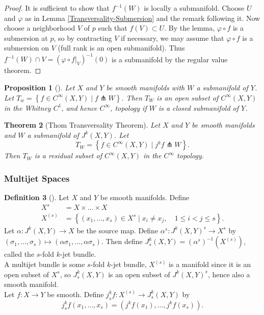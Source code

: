 \documentclass[reqno]{amsart}
\newtheorem{theorem}{Theorem}[section]
\newtheorem{proposition}[theorem]{Proposition}
\theoremstyle{definition}
\newtheorem{definition}[theorem]{Definition}
\theoremstyle{remark}
\begin{document}
\begin{proof}
    It is sufficient to show that
    $f^{-1}(W)$ is locally a submanifold. Choose
    $U$ and $\varphi $ as in Lemma \ref{Transversality-Submersion}
    and the remark following it. Now
    choose a neighborhood $V$ of $p$ such that
    $f(V) \subset U$. By the lemma,
    $\varphi \circ f$ is a submersion at  $p$, so
    by contracting $V$ if necessary, we may assume that
    $\varphi \circ f$ is a submersion on $V$ (full rank is
    an open submanifold). Thus
    $f^{-1}(W) \cap V = \left( \varphi \circ f|_V \right)^{-1}
    (0)$ is a submanifold by the regular value theorem.
\end{proof}



\begin{proposition}[]
    Let $X$ and $Y$ be smooth manifolds with
    $W$ a submanifold of $Y$. 
    Let $T_w = \left\{ f \in C^{\infty}(X,Y)  \mid 
    f \pitchfork W \right\} $. Then
    $T_W$ is an open subset of
    $C^{\infty}(X,Y)$ in the Whitney  $C^{1}$, and hence
    $C^{\infty}$, topology  if $W$ is a closed submanifold
    of $Y$.
\end{proposition}




\begin{theorem}[Thom Transversality Theorem]
    Let $X$ and $Y$ be smooth manifolds and
    $W$ a submanifold of $J^{k}(X,Y)$. Let
    \[
    T_W = \left\{ f \in 
    C^{\infty}(X,Y)  \mid j^{k}f \pitchfork W \right\} .
    \] 
    Then $T_W$ is a residual subset of 
    $C^{\infty}(X,Y)$ in the $C^{\infty}$ topology.
\end{theorem}



\subsubsection{Multijet Spaces}

\begin{definition}[]
Let $X$ and $Y$ be smooth manifolds.
Define
\begin{align*}
    X^{s} &= X \times \ldots \times X\\
    X^{(s)}
    &= \left\{ \left( x_1,\ldots,x_s \right) 
    \in X^{s}  \mid x_i \neq x_j, \quad 1 \le i <j \le s\right\} .
\end{align*}
Let
$\alpha \colon J^{k}(X,Y) \to X$ be the source map.
Define
$\alpha^s \colon J^{k}(X,Y)^{s} \to X^{s}$ 
by $\left( \sigma_1,\ldots, \sigma_s \right) 
\mapsto \left( \alpha \sigma_1, \ldots,
\alpha \sigma_s \right) $.
Then
define
$J_s^{k}(X,Y) = \left( \alpha^s \right)^{-1}
\left( X^{(s)} \right) $, called the
$s$-fold $k$-jet bundle. \\
A multijet bundle is some
$s$-fold $k$-jet bundle,
$X^{(s)}$ is a manifold since it is an open
subset of $X^{s}$, so
$J_s^{k}(X,Y)$ is an open subset
of
$J^{k}(X,Y)^{s}$, hence also a smooth manifold.\\
Let
$f \colon X \to Y$ be smooth.
Define
$j_s^{k} f \colon X^{(s)}\to 
J_{s}^{k}(X,Y)$ by
\[
j_s^{k}f\left( x_1,\ldots, x_s \right) 
= \left( j^{k}f(x_1), \ldots,
j^{k}f(x_s) \right).
\] 
\end{definition}
\end{document}
